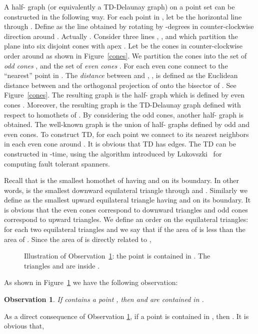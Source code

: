 \documentclass[11pt,a4paper]{article}
\newcommand{\kTD}[2]{\text{-}TD#2}
\newtheorem{observation}{Observation}
\begin{document}
A half- graph (or equivalently a TD-Delaunay graph) on a point set  can be constructed in the following way. For each point  in , let  be the horizontal line through . Define  as the line obtained by rotating  by -degrees in counter-clockwise direction around . Actually . Consider three lines , , and  which partition the plane into six disjoint cones with apex . Let  be the cones in counter-clockwise order around  as shown in Figure~\ref{cones}. We partition the cones into the set of {\em odd cones} , and the set of {\em even cones} . For each even cone  connect  to the ``nearest'' point  in . The {\em distance} between  and , , is defined as the Euclidean distance between  and the orthogonal projection of  onto the bisector of . See Figure~\ref{cones}. The resulting graph is the half- graph which is defined by even cones \cite{Bonichon2010}. Moreover, the resulting graph is the TD-Delaunay graph defined with respect to homothets of . By considering the odd cones, another half- graph is obtained. The well-known  graph is the union of half- graphs defined by odd and even cones. To construct \kTD{k}{}, for each point  we connect  to its  nearest neighbors in each even cone around . It is obvious that \kTD{k}{} has  edges. The \kTD{k}{} can be constructed in -time, using the algorithm introduced by Lukovszki~\cite{Lukovszki1999} for computing fault tolerant spanners.

Recall that  is the smallest homothet of  having  and  on its boundary. In other words,  is the smallest downward equilateral triangle through  and . Similarly we define  as the smallest upward equilateral triangle having  and  on its boundary. It is obvious that the even cones correspond to downward triangles and odd cones correspond to upward triangles.   
We define an order on the equilateral triangles: for each two equilateral triangles  and  we say that  if the area of  is less than the area of . Since the area of  is directly related to , 


\begin{figure}[htb]
  \centering
\setlength{\tabcolsep}{0in}
  
  \caption{Illustration of Observation~\ref{obs1}: the point  is contained in . The triangles  and  are inside .}
\label{smaller-triangle-fig}
\end{figure}

As shown in Figure~\ref{smaller-triangle-fig} we have the following observation:

\begin{observation}
\label{obs1}
 If  contains a point , then  and  are contained in .
\end{observation}
As a direct consequence of Observation \ref{obs1}, if a point  is contained in , then . It is obvious that,
\end{document}
